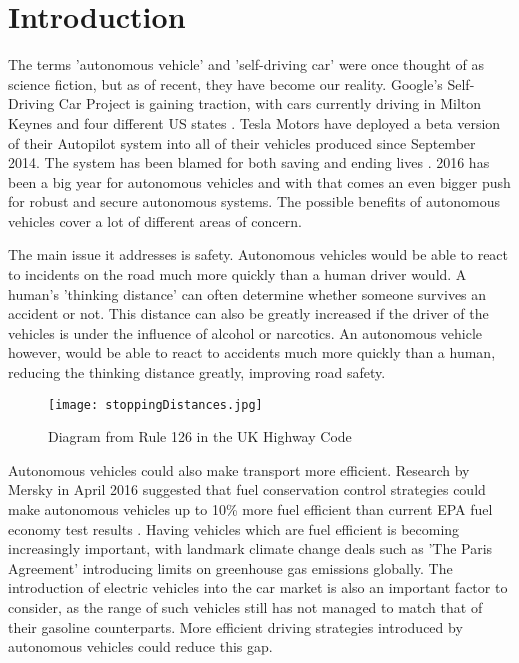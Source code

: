 \chapter{Introduction}
\label{cha:Introduction}

The terms 'autonomous vehicle' and 'self-driving car' were once thought of as science fiction, but as of recent, they have become our reality. Google's Self-Driving Car Project is gaining traction, with cars currently driving in Milton Keynes and four different US states \citep{GoogleCars}. Tesla Motors have deployed a beta version of their Autopilot system into all of their vehicles produced since September 2014. The system has been blamed for both saving and ending lives \citep{TeslaHospital} \citep{TeslaUnderInvestigation}. 2016 has been a big year for autonomous vehicles and with that comes an even bigger push for robust and secure autonomous systems.
The possible benefits of autonomous vehicles cover a lot of different areas of concern. 

The main issue it addresses is safety. Autonomous vehicles would be able to react to incidents on the road much more quickly than a human driver would. A human's 'thinking distance' can often determine whether someone survives an accident or not. This distance can also be greatly increased if the driver of the vehicles is under the influence of alcohol or narcotics. An autonomous vehicle however, would be able to react to accidents much more quickly than a human, reducing the thinking distance greatly, improving road safety.

\begin{figure}[h]
\texttt{[image: stoppingDistances.jpg]}
\caption{Diagram from Rule 126 in the UK Highway Code \citep{StoppingDistances}}
\end{figure}

Autonomous vehicles could also make transport more efficient. Research by Mersky in April 2016 suggested that fuel conservation control strategies could make autonomous vehicles up to 10\% more fuel efficient than current EPA fuel economy test results \citep{Mersky2016} . Having vehicles which are fuel efficient is becoming increasingly important, with landmark climate change deals such as 'The Paris Agreement' introducing limits on greenhouse gas emissions globally. The introduction of electric vehicles into the car market is also an important factor to consider, as the range of such vehicles still has not managed to match that of their gasoline counterparts. More efficient driving strategies introduced by autonomous vehicles could reduce this gap.

